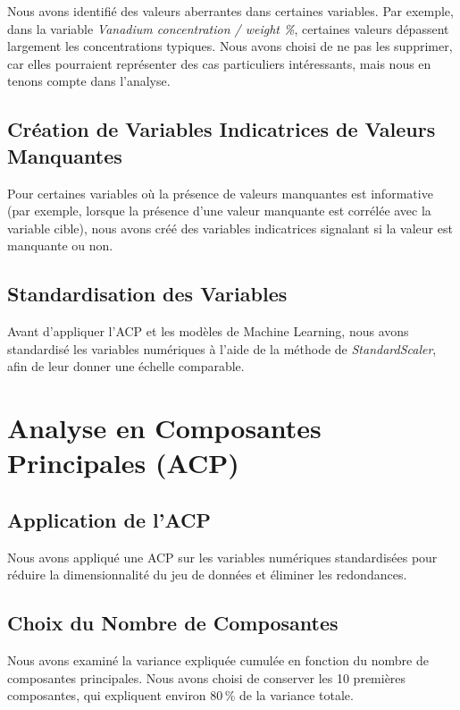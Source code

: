 \documentclass{article}
\begin{document}
Nous avons identifié des valeurs aberrantes dans certaines variables. Par exemple, dans la variable \textit{Vanadium concentration / weight \%}, certaines valeurs dépassent largement les concentrations typiques. Nous avons choisi de ne pas les supprimer, car elles pourraient représenter des cas particuliers intéressants, mais nous en tenons compte dans l'analyse.

\subsection{Création de Variables Indicatrices de Valeurs Manquantes}

Pour certaines variables où la présence de valeurs manquantes est informative (par exemple, lorsque la présence d'une valeur manquante est corrélée avec la variable cible), nous avons créé des variables indicatrices signalant si la valeur est manquante ou non.

\subsection{Standardisation des Variables}

Avant d'appliquer l'ACP et les modèles de Machine Learning, nous avons standardisé les variables numériques à l'aide de la méthode de \textit{StandardScaler}, afin de leur donner une échelle comparable.

\section{Analyse en Composantes Principales (ACP)}

\subsection{Application de l'ACP}

Nous avons appliqué une ACP sur les variables numériques standardisées pour réduire la dimensionnalité du jeu de données et éliminer les redondances.

\subsection{Choix du Nombre de Composantes}

Nous avons examiné la variance expliquée cumulée en fonction du nombre de composantes principales. Nous avons choisi de conserver les 10 premières composantes, qui expliquent environ 80\,\% de la variance totale.
\end{document}
